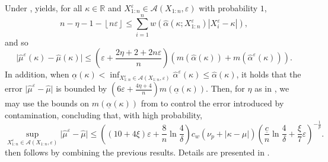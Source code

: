 \documentclass{article}
\theoremstyle{plain}
\theoremstyle{definition}
\def\R{\mathbb{R}} %
\def\eps{\varepsilon}
\def\sA{\mathcal{A}}
\begin{document}
Under ,  yields, for all \( \kappa \in \R \) and \( X_{1:n}^\varepsilon \in \sA(X_{1:n}, \varepsilon ) \) with probability \( 1 \), \[
n-\eta-1-\left\lfloor n \varepsilon  \right\rfloor \leq \sum_{i=1}^n w\left(\widehat{\alpha}\left(\kappa; X_{1:n}^\varepsilon \right) |X_i^\varepsilon  - \kappa|\right),
\] 
and so \[
  \lvert \widehat{\mu}^\eps(\kappa ) - \widehat{\mu}(\kappa )   \rvert \le \left(\eps+\frac{2 \eta + 2 + 2n \varepsilon }{n}\right) \left(m(\widehat{\alpha}(\kappa  ) )+m(\widehat{\alpha }^\eps(\kappa  )  )\right) .
\]  
In addition, when \( \underline{\alpha }(\kappa ) < \inf_{X_{1:n}^\varepsilon \in \sA(X_{1:n},\varepsilon )  }\widehat{\alpha }^\eps (\kappa )\le \widehat{\alpha}(\kappa )    \), it holds that the error \( \lvert \widehat{\mu }^\varepsilon  - \widehat{\mu }   \rvert  \) is bounded by \(  \left(6\eps + \frac{4\eta+4}{n}\right)m(\underline{\alpha }(\kappa ))  \). Then, for \( \eta  \) as in , we may use the bounds on \( m(\underline{\alpha }(\kappa ))  \) from  to control the error introduced by contamination, concluding that, with high probability, \[
  \sup_{X_{1:n}^\varepsilon \in \sA(X_{1:n},\varepsilon )}\lvert \widehat{\mu}^\eps -\widehat{\mu}   \rvert \le \left( (10+4\xi) \eps + \frac{8}{n} \ln \frac{4}{\delta }\right)c_w (\nu _p + \lvert \kappa -\mu  \rvert )\left(\frac{\underline{c}}{n}\ln \frac{4}{\delta }+\frac{\xi}{7}\varepsilon \right)^{-\frac{1}{p}}. 
\] 
 then follows by combining the previous results. Details are presented in .
\end{document}
